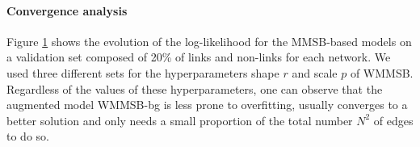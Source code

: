 
\begin{table}
\centering
	
\label{table:roc}
\end{table}

%
%
\paragraph {Convergence analysis} %
Figure \ref{fig:conv_entropy} shows the evolution of the log-likelihood for the MMSB-based models on a validation set composed of 20\% of links and non-links for each network. We used three different sets for the hyperparameters shape $r$ and scale $p$ of WMMSB. Regardless of the values of these hyperparameters, one can observe that the augmented model WMMSB-bg is less prone to overfitting, usually converges to a better solution and only needs a small proportion of the total number $N^2$ of edges to do so.

\begin{figure}[h]
\centering
	
    \label{fig:conv_entropy}
\end{figure}

